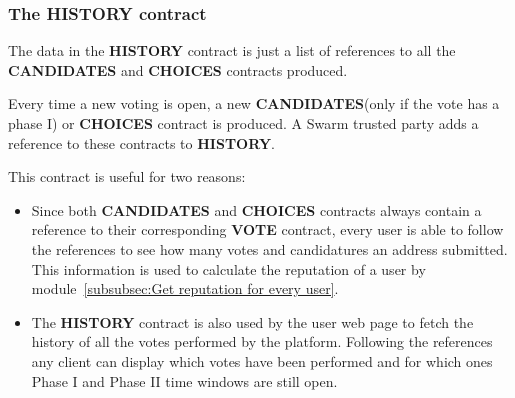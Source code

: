 \documentclass[submission, copyright,creativecommons,sharealike,noncommercial]{eptcs}
\newcommand{\Candidates}{\textbf{CANDIDATES}\xspace}
\newcommand{\Choices}{\textbf{CHOICES}\xspace}
\newcommand{\Vote}{\textbf{VOTE}\xspace}
\newcommand{\History}{\textbf{HISTORY}\xspace}
\begin{document}
\subsubsection{The \History contract}\label{subsubsec:The reputation contract}
	The data in the \History contract is just a list of references to all the \Candidates and \Choices contracts produced. 
	
	Every time a new voting is open, a new \Candidates (only if the vote has a phase I) or \Choices contract is produced. A Swarm trusted party adds a reference to these contracts to \History. 
	
	This contract is useful for two reasons:
	\begin{itemize}
		\item Since both \Candidates and \Choices contracts always contain a reference to their corresponding \Vote contract, every user is able to follow the references to see how many votes and candidatures an address submitted. This information is used to calculate the reputation of a user by module~\ref{subsubsec:Get reputation for every user}.
		
		\item The \History contract is also used by the user web page to fetch the history of all the votes performed by the platform. Following the references any client can display which votes have been performed and for which ones Phase I and Phase II time windows are still open.
	\end{itemize}
%	
	
\end{document}
